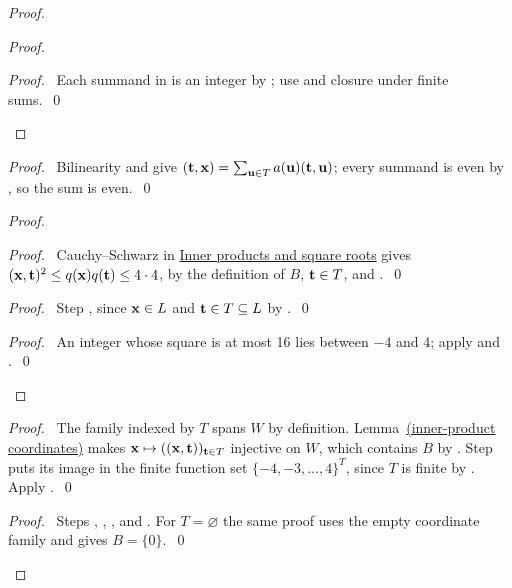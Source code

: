 \begin{mergedproofsection}
\begin{proof}
\begin{proof}
 \qedstep
 \begin{proof}\pf\ Each summand in  is an integer
 by ; use  and closure under finite sums.~\qed\end{proof}
\end{proof}
\begin{proof}\pf\ Bilinearity and  give
$({\mathbf t},{\mathbf x})=\sum_{{\mathbf u}\in T}a({\mathbf u})({\mathbf t},{\mathbf u})$; every summand is even by
, so the sum is even.~\qed\end{proof}
\begin{proof}
 \begin{proof}\pf\ Cauchy--Schwarz in \hyperref[facts:312-inner]{Inner products and square roots} gives
 $({\mathbf x},{\mathbf t})^2\leq q({\mathbf x})q({\mathbf t})\leq4\cdot4$,
 by the definition of $B$, ${\mathbf t}\in T$, and .~\qed\end{proof}
 \begin{proof}\pf\ Step , since ${\mathbf x}\in L$ and
 ${\mathbf t}\in T\subseteq L$ by .~\qed\end{proof}
 \qedstep
 \begin{proof}\pf\ An integer whose square is at most 16 lies between
 $-4$ and 4; apply  and .~\qed\end{proof}
\end{proof}
\begin{proof}\pf\ The family indexed by $T$ spans $W$ by definition.
Lemma~\hyperref[lem:312-coordinates]{(inner-product coordinates)} makes
${\mathbf x}\mapsto(({\mathbf x},{\mathbf t}))_{{\mathbf t}\in T}$ injective on $W$, which contains
$B$ by . Step  puts its
image in the finite function set $\{-4,-3,\ldots,4\}^{T}$, since
$T$ is finite by . Apply .~\qed\end{proof}
\qedstep
\begin{proof}\pf\ Steps , ,
, and . For $T=\varnothing$
the same proof uses the empty coordinate family and gives $B=\{0\}$.~\qed\end{proof}
\end{proof}


\end{mergedproofsection}
